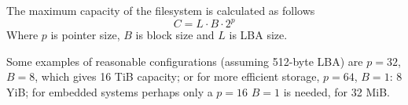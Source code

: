 \documentclass[]{article}
\begin{document}
	The maximum capacity of the filesystem is calculated as follows
	\begin{equation}
		C = L \cdot B \cdot 2^p
	\end{equation}
	Where $p$ is pointer size, $B$ is block size and $L$ is LBA size.
	
	Some examples of reasonable configurations (assuming 512-byte LBA) are $p = 32$, $B = 8$, which gives 16 TiB capacity; or for more efficient storage, $p = 64$, $B = 1$: 8 YiB; for embedded systems perhaps only a $p = 16$ $B = 1$ is needed, for 32 MiB.
	
	
\end{document}
